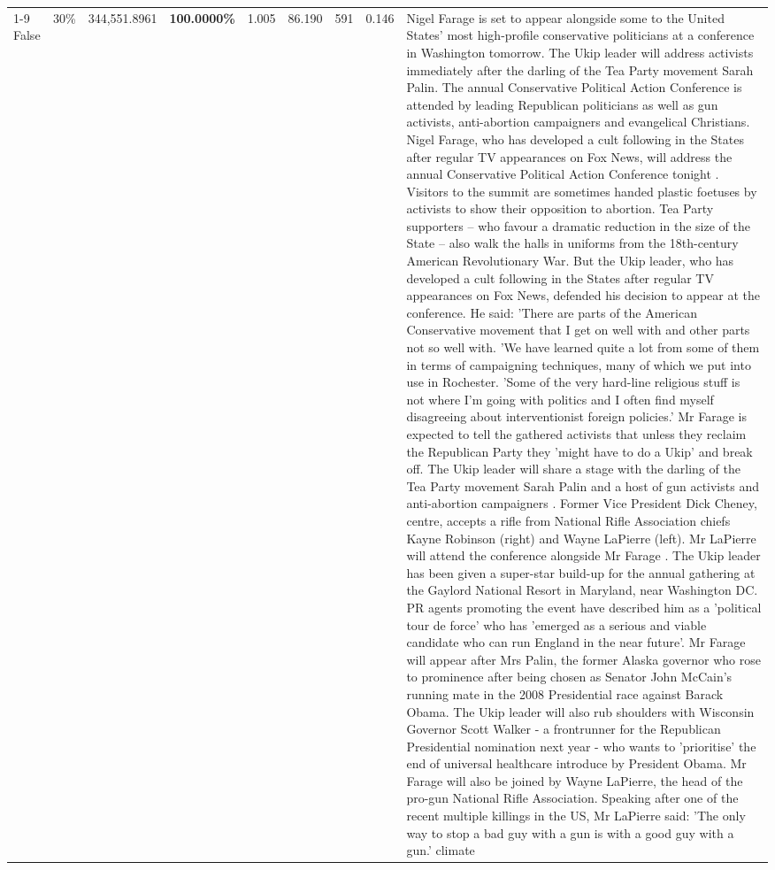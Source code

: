 \begin{table}[H]
\begin{tabular}{lllrlllll}
\cline{1-9} \cline{2-9}
False & 30\% & 344,551.8961 & \bfseries \color{red} 100.0000\% & 1.005 & 86.190 & 591 & 0.146 & Nigel Farage is set to appear alongside some to the United States' most high-profile conservative politicians at a conference in Washington tomorrow. The Ukip leader will address activists immediately after the darling of the Tea Party movement Sarah Palin. The annual Conservative Political Action Conference is attended by leading Republican politicians as well as gun activists, anti-abortion campaigners and evangelical Christians. Nigel Farage, who has developed a cult following in the States after regular TV appearances on Fox News, will address the annual Conservative Political Action Conference tonight . Visitors to the summit are sometimes handed plastic foetuses by activists to show their opposition to abortion. Tea Party supporters – who favour a dramatic reduction in the size of the State – also walk the halls in uniforms from the 18th-century American Revolutionary War. But the Ukip leader, who has developed a cult following in the States after regular TV appearances on Fox News, defended his decision to appear at the conference. He said: 'There are parts of the American Conservative movement that I get on well with and other parts not so well with. 'We have learned quite a lot from some of them in terms of campaigning techniques, many of which we put into use in Rochester. 'Some of the very hard-line religious stuff is not where I'm going with politics and I often find myself disagreeing about interventionist foreign policies.' Mr Farage is expected to tell the gathered activists that unless they reclaim the Republican Party they 'might have to do a Ukip' and break off. The Ukip leader will share a stage with the darling of the Tea Party movement Sarah Palin and a host of gun activists and anti-abortion campaigners . Former Vice President Dick Cheney, centre, accepts a rifle from National Rifle Association chiefs Kayne Robinson (right) and Wayne LaPierre (left). Mr LaPierre will attend the conference alongside Mr Farage . The Ukip leader has been given a super-star build-up for the annual gathering at the Gaylord National Resort in Maryland, near Washington DC. PR agents promoting the event have described him as a 'political tour de force' who has 'emerged as a serious and viable candidate who can run England in the near future'. Mr Farage will appear after Mrs Palin, the former Alaska governor who rose to prominence after being chosen as Senator John McCain's running mate in the 2008 Presidential race against Barack Obama. The Ukip leader will also rub shoulders with Wisconsin Governor Scott Walker - a frontrunner for the Republican Presidential nomination next year - who wants to 'prioritise' the end of universal healthcare introduce by President Obama. Mr Farage will also be joined by Wayne LaPierre, the head of the pro-gun National Rifle Association. Speaking after one of the recent multiple killings in the US, Mr LaPierre said: 'The only way to stop a bad guy with a gun is with a good guy with a gun.' climate \\

\end{tabular}
\end{table}
